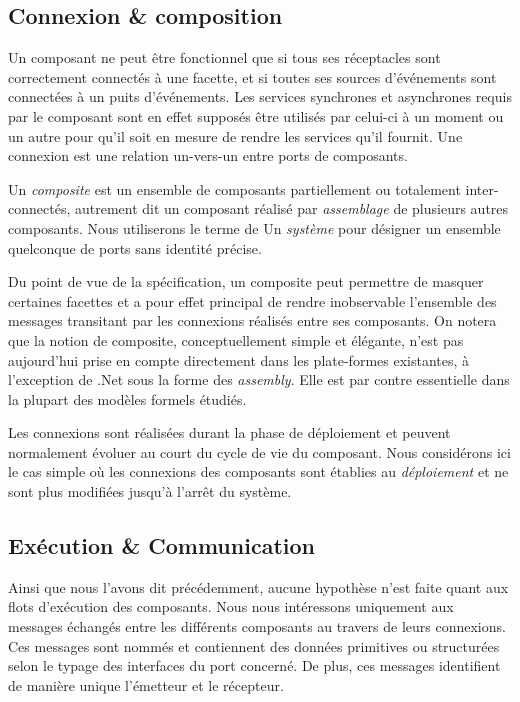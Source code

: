 \subsection{Connexion \& composition}

Un composant ne peut \^etre fonctionnel que si tous ses r\'eceptacles sont
correctement connect\'es \`a une facette, et si toutes ses sources 
d'\'ev\'enements sont connect\'ees \`a un puits
d'\'ev\'enements. Les services synchrones et asynchrones requis par
le composant sont en effet suppos\'es \^etre utilis\'es par
celui-ci \`a un moment ou un autre pour qu'il soit en mesure de
rendre les services qu'il fournit. Une connexion
est une relation un-vers-un  entre ports de composants. 

Un \emph{composite} est un ensemble de composants  partiellement ou
totalement inter-connect\'es, autrement dit un composant r\'ealis\'e par
\emph{assemblage} de plusieurs autres composants. Nous utiliserons le
terme de Un \emph{syst\`eme} pour d\'esigner un ensemble quelconque
de ports sans identit\'e pr\'ecise. 

Du point de vue de la sp\'ecification, un composite peut permettre de
masquer certaines facettes et a pour effet principal de rendre
inobservable l'ensemble des messages transitant par les connexions
r\'ealis\'es entre ses composants.  
On notera que la notion de composite, conceptuellement simple et
  \'el\'egante, n'est pas aujourd'hui prise en compte 
  directement dans les plate-formes existantes, \`a l'exception de
  \textsf{.Net} sous la forme des \emph{assembly}. Elle est par contre essentielle dans
la plupart des mod\`eles formels \'etudi\'es. 

Les connexions sont r\'ealis\'ees durant la phase de d\'eploiement et peuvent normalement
\'evoluer au court du cycle de vie du composant. Nous
consid\'erons ici le cas simple o\`u les connexions des composants sont
  \'etablies au \emph{d\'eploiement} et ne sont plus modifi\'ees jusqu'\`a l'arr\^et du
  syst\`eme. 

\subsection{Ex\'ecution \& Communication}

Ainsi que nous l'avons dit pr\'ec\'edemment, aucune hypoth\`ese n'est faite
quant aux flots d'ex\'ecution des composants. Nous nous int\'eressons
uniquement aux messages \'echang\'es entre les diff\'erents composants au
travers de leurs connexions. Ces messages sont nomm\'es et contiennent
des donn\'ees primitives ou structur\'ees selon le typage des interfaces
du port concern\'e. De plus, ces messages identifient de mani\`ere
unique l'\'emetteur et  le r\'ecepteur.

